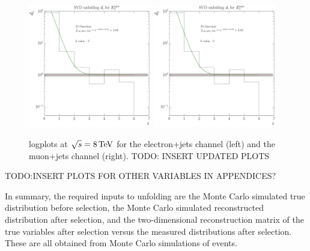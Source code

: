 \begin{figure}[hbtp]
    \centering
     \includegraphics[width=0.48\textwidth]{Chapters/04_Analysis/04b_XSections/images/unfolding_tests/8TeV/k_values/k_from_d_i_electron_channel_MET_data.pdf}\hfill
     \includegraphics[width=0.48\textwidth]{Chapters/04_Analysis/04b_XSections/images/unfolding_tests/8TeV/k_values/k_from_d_i_electron_channel_MET_data.pdf}\\
	 \caption{log\abs[d[i] plots at $\sqrt{s}=8\,\text{Te\hspace{-.08em}V}$ for the electron+jets channel (left) and the muon+jets
	 channel (right). TODO: INSERT UPDATED PLOTS} %
     \label{fig:d_plots_7TeV}
\end{figure}



TODO:INSERT PLOTS FOR OTHER VARIABLES IN APPENDICES?

In summary, the required inputs to unfolding are the Monte Carlo simulated true distribution before
selection, the Monte Carlo simulated reconstructed distribution after selection, and the two-dimensional reconstruction
matrix of the true variables after selection versus the measured distributions after selection. These are all
obtained from Monte Carlo simulations of \ttbar events. 

